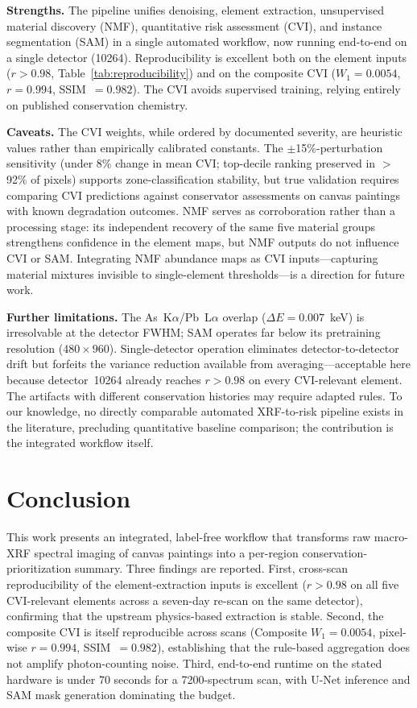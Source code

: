 \documentclass[conference]{IEEEtran}
\begin{document}
\textbf{Strengths.} The pipeline unifies denoising, element extraction, unsupervised material discovery (NMF), quantitative risk assessment (CVI), and instance segmentation (SAM) in a single automated workflow, now running end-to-end on a single detector (10264). Reproducibility is excellent both on the element inputs ($r > 0.98$, Table~\ref{tab:reproducibility}) and on the composite CVI ($W_1 = 0.0054$, $r = 0.994$, SSIM~$= 0.982$). The CVI avoids supervised training, relying entirely on published conservation chemistry.

\textbf{Caveats.} The CVI weights, while ordered by documented severity, are heuristic values rather than empirically calibrated constants. The $\pm$15\%-perturbation sensitivity (under 8\% change in mean CVI; top-decile ranking preserved in $>$92\% of pixels) supports zone-classification stability, but true validation requires comparing CVI predictions against conservator assessments on canvas paintings with known degradation outcomes. NMF serves as corroboration rather than a processing stage: its independent recovery of the same five material groups strengthens confidence in the element maps, but NMF outputs do not influence CVI or SAM. Integrating NMF abundance maps as CVI inputs---capturing material mixtures invisible to single-element thresholds---is a direction for future work.

\textbf{Further limitations.} The As~K$\alpha$/Pb~L$\alpha$ overlap ($\Delta E = 0.007$~keV) is irresolvable at the detector FWHM; SAM operates far below its pretraining resolution ($480 \times 960$). Single-detector operation eliminates detector-to-detector drift but forfeits the variance reduction available from averaging---acceptable here because detector~10264 already reaches $r > 0.98$ on every CVI-relevant element. The artifacts with different conservation histories may require adapted rules. To our knowledge, no directly comparable automated XRF-to-risk pipeline exists in the literature, precluding quantitative baseline comparison; the contribution is the integrated workflow itself.

\section{Conclusion}

This work presents an integrated, label-free workflow that transforms raw macro-XRF spectral imaging of canvas paintings into a per-region conservation-prioritization summary. Three findings are reported. First, cross-scan reproducibility of the element-extraction inputs is excellent ($r > 0.98$ on all five CVI-relevant elements across a seven-day re-scan on the same detector), confirming that the upstream physics-based extraction is stable. Second, the composite CVI is itself reproducible across scans (Composite $W_1 = 0.0054$, pixel-wise $r = 0.994$, SSIM~$= 0.982$), establishing that the rule-based aggregation does not amplify photon-counting noise. Third, end-to-end runtime on the stated hardware is under 70 seconds for a 7200-spectrum scan, with U-Net inference and SAM mask generation dominating the budget.
\end{document}
